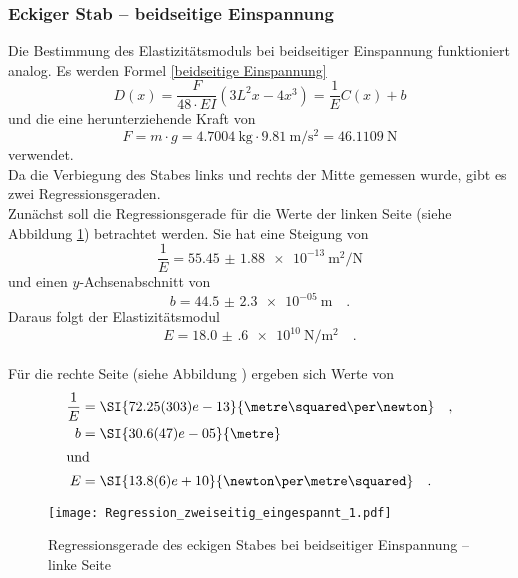 \subsubsection{Eckiger Stab -- beidseitige Einspannung}
Die Bestimmung des Elastizitätsmoduls bei beidseitiger Einspannung funktioniert analog. Es werden Formel \eqref{beidseitige Einspannung}
\begin{equation*}
	D(x) = \frac{F}{48\cdot E I}\left(3L^2x-4x^3\right) = \frac{1}{E}C(x)+b
\end{equation*}
und die eine herunterziehende Kraft von
\begin{equation}
  F = m \cdot g = \SI{4.7004}{\kilo\gram} \cdot \SI{9.81}{\metre\per\second\squared} = \SI{46.1109}{\newton}
\end{equation}
verwendet. \\
Da die Verbiegung des Stabes links und rechts der Mitte gemessen wurde, gibt es zwei Regressionsgeraden. \\
Zunächst soll die Regressionsgerade für die Werte der linken Seite (siehe Abbildung \ref{fig:linkeseite}) betrachtet werden. Sie hat eine Steigung von
\begin{equation}
  \frac{1}{E}= \SI{55.45(188)e-13}{\metre\squared\per\newton}
\end{equation}
und einen $y$-Achsenabschnitt von
\begin{equation}
  b = \SI{44.5(23)e-05}{\metre} \quad.
\end{equation}
Daraus folgt der Elastizitätsmodul
\begin{equation}
  E = \SI{18.0(6)e+10}{\newton\per\metre\squared} \quad.
\end{equation}
\\
Für die rechte Seite (siehe Abbildung \label{fig:rechteseite}) ergeben sich Werte von
\begin{align}
  \frac{1}{E} &= \SI{72.25(303)e-13}{\metre\squared\per\newton} \quad,\\
  b &= \SI{30.6(47)e-05}{\metre} \\
  \intertext{und}
  E &= \SI{13.8(6)e+10}{\newton\per\metre\squared} \quad.
\end{align}


\begin{figure}[h!]
\centering
\texttt{[image: Regression\_zweiseitig\_eingespannt\_1.pdf]}
\caption{Regressionsgerade des eckigen Stabes bei beidseitiger Einspannung -- linke Seite}
\label{fig:linkeseite}
\end{figure}

